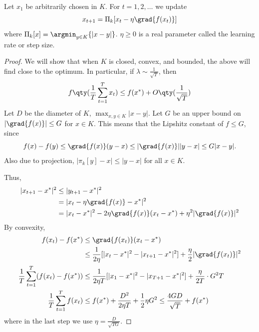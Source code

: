 \begin{algothm}
    Let $x_1$ be arbitrarily chosen in $K$.
    For $t = 1, 2, \dots$ we update
    \[ x_{t + 1} = \Pi_k[x_t - \eta \grad{f(x_t)}] \]
    where $\Pi_k[x] = \argmin_{y \in K} \{|x - y|\}$.
    $\eta \ge 0$ is a real parameter called the learning rate or step size.

    \begin{proof}
        We will show that when $K$ is closed, convex, and bounded,
        the above will find close to the optimum.
        In particular, if $\lambda \sim \frac{1}{\sqrt{T}}$,
        then 
        \[ f\qty(\frac{1}{T} \sum_{t = 1}^T x_t) \le f(x^*) + O\qty(\frac{1}{\sqrt{T}})\]
        Let $D$ be the diameter of $K$, $ \max_{x, y \in K} | x - y|$.
        Let $G$ be an upper bound on $|\grad{f(x)}| \le G$ for $x \in K$.
        This means that the Lipshitz constant of $f \le G$, since
        \[ f(x) - f(y) \le \grad{f(x)}(y - x) \le |\grad{f(x)}| |y - x| \le G |x - y|.\]
        Also due to projection, $|\pi_k[y] - x| \le |y - x|$ for all $x \in K$.

        Thus,
        \begin{align*}
            |x_{t + 1} - x^*|^2 &\le |y_{t + 1} - x^*|^2 \\
            &=|x_t - \eta \grad{f(x)} - x^*|^2 \\
            &= |x_t - x^*|^2 - 2 \eta \grad{f(x)}(x_t - x^*) + \eta^2 |\grad{f(x)}|^2
        \end{align*}
        By convexity,
        \begin{align*}
            f(x_t) - f(x^*) &\le \grad{f(x_t)}(x_t - x^*) \\
            &\le \frac{1}{2\eta} [|x_t - x^*|^2 - |x_{t + 1} - x^*|^2 ] + \frac{\eta}{2} |\grad{f(x_t)}|^2 \\
            \frac{1}{T} \sum_{t = 1}^{T} (f(x_t) - f(x^*)) &\le \frac{1}{2\eta T} [|x_1 - x^*|^2 - |x_{T + 1} - x^*|^2] + \frac{\eta}{2T} \cdot G^2 T \\
            \frac{1}{T} \sum_{t = 1}^T f(x_t) &\le f(x^*) + \frac{D^2}{2\eta T} + \frac{1}{2} \eta G^2 \le \frac{4GD}{\sqrt{T}} + f(x^*)
        \end{align*}
        where in the last step we use $\eta = \frac{D}{\sqrt{TG}}$.
    \end{proof}
\end{algothm}


